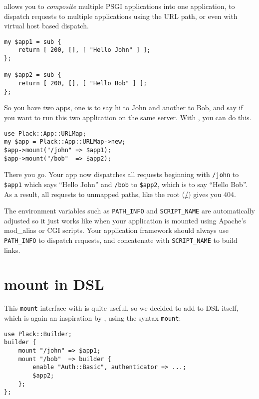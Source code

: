  allows you to \emph{composite} multiple PSGI
applications into one application, to dispatch requests to multiple
applications using the URL path, or even with virtual host based
dispatch.

\begin{lstlisting}
my $app1 = sub {
    return [ 200, [], [ "Hello John" ] ];
};

my $app2 = sub {
    return [ 200, [], [ "Hello Bob" ] ];
};
\end{lstlisting}

So you have two apps, one is to say hi to John and another to Bob, and
say if you want to run this two application on the same server. With
, you can do this.

\begin{lstlisting}
use Plack::App::URLMap;
my $app = Plack::App::URLMap->new;
$app->mount("/john" => $app1);
$app->mount("/bob"  => $app2);
\end{lstlisting}

There you go. Your app now dispatches all requests beginning with
\lstinline!/john! to \lstinline!$app1! which says ``Hello John'' and
\lstinline!/bob! to \lstinline!$app2!, which is to say ``Hello Bob''. As
a result, all requests to unmapped paths, like the root (\url{/}) gives
you 404.

The environment variables such as \lstinline!PATH_INFO! and
\lstinline!SCRIPT_NAME! are automatically adjusted so it just works like
when your application is mounted using Apache's mod\_alias or CGI
scripts. Your application framework should always use
\lstinline!PATH_INFO! to dispatch requests, and concatenate with
\lstinline!SCRIPT_NAME! to build links.

\section{mount in DSL}\label{mount-in-dsl}

This \lstinline!mount! interface with  is quite
useful, so we decided to add to  DSL itself, which is
again an inspiration by , using the syntax
\lstinline!mount!:

\begin{lstlisting}
use Plack::Builder;
builder {
    mount "/john" => $app1;
    mount "/bob"  => builder {
        enable "Auth::Basic", authenticator => ...;
        $app2;
    };
};
\end{lstlisting}


